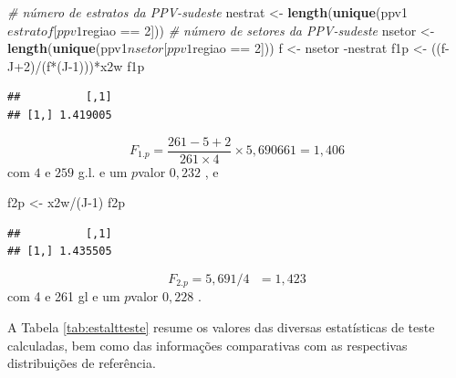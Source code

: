 \documentclass[]{book}
\newenvironment{Shaded}{\begin{snugshade}}{\end{snugshade}}
\newcommand{\KeywordTok}[1]{\textcolor[rgb]{0.13,0.29,0.53}{\textbf{{#1}}}}
\newcommand{\DecValTok}[1]{\textcolor[rgb]{0.00,0.00,0.81}{{#1}}}
\newcommand{\StringTok}[1]{\textcolor[rgb]{0.31,0.60,0.02}{{#1}}}
\newcommand{\CommentTok}[1]{\textcolor[rgb]{0.56,0.35,0.01}{\textit{{#1}}}}
\newcommand{\NormalTok}[1]{{#1}}
\numberwithin{example}{chapter}
\numberwithin{remark}{chapter}
\numberwithin{definition}{chapter}
\begin{document}
\begin{Shaded}
\begin{Highlighting}[]
\CommentTok{# número de estratos da PPV-sudeste}
\NormalTok{nestrat <-}\StringTok{ }\KeywordTok{length}\NormalTok{(}\KeywordTok{unique}\NormalTok{(ppv1$estratof[ppv1$regiao ==}\StringTok{ }\DecValTok{2}\NormalTok{]))}
\CommentTok{# número de setores da PPV-sudeste}
\NormalTok{nsetor <-}\StringTok{ }\KeywordTok{length}\NormalTok{(}\KeywordTok{unique}\NormalTok{(ppv1$nsetor[ppv1$regiao ==}\StringTok{ }\DecValTok{2}\NormalTok{]))}
\NormalTok{f <-}\StringTok{ }\NormalTok{nsetor -nestrat}
\NormalTok{f1p <-}\StringTok{ }\NormalTok{((f-J}\DecValTok{+2}\NormalTok{)/(f*(J}\DecValTok{-1}\NormalTok{)))*x2w}
\NormalTok{f1p}
\end{Highlighting}
\end{Shaded}

\begin{verbatim}
##          [,1]
## [1,] 1.419005
\end{verbatim}

\[
F_{1.p}=\frac{261-5+2}{261\times 4}\times 5,690661=1,406 
\] com \(4\) e \(259\) g.l. e um \(p\)valor \(0,232\) , e

\begin{Shaded}
\begin{Highlighting}[]
\NormalTok{f2p <-}\StringTok{ }\NormalTok{x2w/(J}\DecValTok{-1}\NormalTok{)}
\NormalTok{f2p}
\end{Highlighting}
\end{Shaded}

\begin{verbatim}
##          [,1]
## [1,] 1.435505
\end{verbatim}

\[
F_{2.p}=5,691/4\mbox{ }=1,423 
\] com 4 e 261 gl e um \(p\)valor \(0,228\) .

A Tabela \ref{tab:estaltteste} resume os valores das diversas
estatísticas de teste calculadas, bem como das informações comparativas
com as respectivas distribuições de referência.
\end{document}
